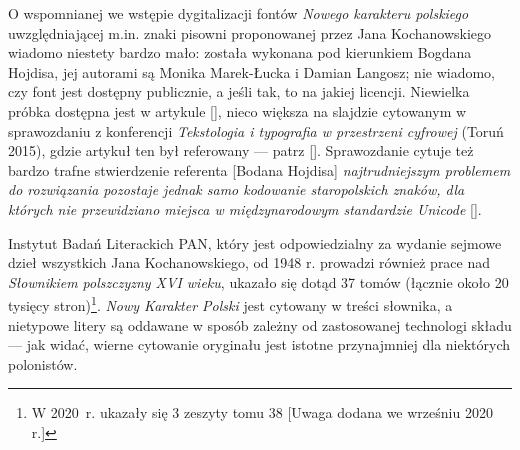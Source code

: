 




O wspomnianej we wstępie dygitalizacji fontów \textit{Nowego karakteru
  polskiego} uwzględniającej m.in. znaki pisowni proponowanej przez
Jana Kochanowskiego wiadomo niestety bardzo mało: została wykonana pod
kierunkiem Bogdana Hojdisa, jej autorami są Monika Marek-Łucka i
Damian Langosz; nie wiadomo, czy font jest dostępny publicznie, a
jeśli tak, to na jakiej licencji. Niewielka próbka dostępna jest w
artykule [\cite[9]{hojdis_problemy_2016}],%
nieco większa na
slajdzie cytowanym w sprawozdaniu z konferencji \textit{Tekstologia i
  typografia w przestrzeni cyfrowej} (Toruń 2015), gdzie artykuł ten
był referowany --- patrz [\cite[73]{pest15:_t_t}]. Sprawozdanie cytuje
też bardzo trafne stwierdzenie referenta [Bodana Hojdisa]
\textit{najtrudniejszym problemem do rozwiązania pozostaje jednak samo
  kodowanie staropolskich znaków, dla których nie przewidziano miejsca
  w międzynarodowym standardzie Unicode} [\cite[72]{pest15:_t_t}].


Instytut Badań Literackich PAN, który jest odpowiedzialny za wydanie
sejmowe dzieł wszystkich Jana Kochanowskiego, od 1948 r. prowadzi
również prace nad \textit{Słownikiem polszczyzny XVI wieku}, ukazało
się dotąd 37 tomów (łącznie około 20 tysięcy stron)\footnote{W
  2020~r. ukazały się 3 zeszyty tomu 38 [Uwaga dodana we wrześniu 2020
  r.]}. \textit{Nowy Karakter Polski} jest cytowany w treści słownika,
a nietypowe litery są oddawane w sposób zależny od zastosowanej
technologi składu --- jak widać, wierne cytowanie oryginału jest
istotne przynajmniej dla niektórych polonistów.

